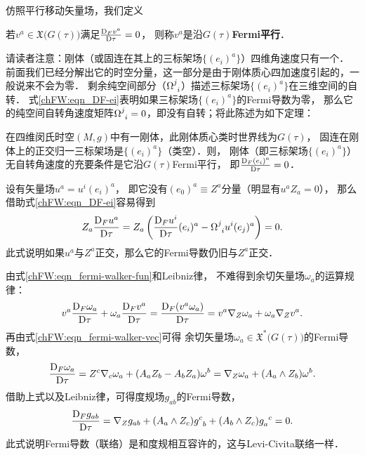 仿照平行移动矢量场，我们定义
\begin{definition}
	若$v^a\in \mathfrak{X}\bigl(G(\tau)\bigr)$满足$\frac{{\rm D}_F v^a}{{\rm D}\tau}=0$，
	则称$v^a$是沿$G(\tau)${\heiti\bfseries Fermi平行}．
\end{definition}

请读者注意：刚体（或固连在其上的三标架场$\{(e_i)^a\}$）四维角速度只有一个．
前面我们已经分解出它的时空分量，这一部分是由于刚体质心四加速度引起的，一般说来不会为零．
剩余纯空间部分（$\Omega^{j}_{\hphantom{j} i}$）描述三标架场$\{(e_i)^a\}$在三维空间的自转．
式\eqref{chFW:eqn_DF-ei}表明如果三标架场$\{(e_i)^a\}$的Fermi导数为零，
那么它的纯空间自转角速度矩阵$\Omega^{j}_{\hphantom{j} i}=0$，即没有自转；将此陈述为如下定理：

\begin{theorem}\label{chFW:thm_FermiD-rotation}
	在四维闵氏时空$(M,g)$中有一刚体，此刚体质心类时世界线为$G(\tau)$，
	固连在刚体上的正交归一三标架场是$\{(e_i)^a\}$（类空）．则，
	刚体（即三标架场$\{(e_i)^a\}$）无自转角速度的充要条件是它沿$G(\tau)$Fermi平行，
	即$\frac{{\rm D}_F (e_i)^a}{{\rm D}\tau}=0$．
\end{theorem}




设有矢量场$u^a = u^i (e_i)^a$，
即它没有$(e_0)^a\equiv Z^a$分量（明显有$u^a Z_a =0$），
那么借助式\eqref{chFW:eqn_DF-ei}容易得到
\begin{equation}\label{chFW:eqn_DFuz=0}
	Z_a \frac{{\rm D}_F u^a}{{\rm D}\tau} =
	Z_a \left( \frac{{\rm D}_F u^i}{{\rm D}\tau} (e_i)^a
	-\Omega^{j}_{\hphantom{j} i} u^i (e_j)^a  \right) = 0.
\end{equation}
此式说明如果$u^a$与$Z^a$正交，那么它的Fermi导数仍旧与$Z^a$正交．


由式\eqref{chFW:eqn_fermi-walker-fun}和Leibniz律，
不难得到余切矢量场$\omega_a$的运算规律：
\begin{equation*}
	v^a \frac{{\rm D}_F \omega_a}{{\rm D}\tau}
	+\omega_a \frac{{\rm D}_F v^a }{{\rm D}\tau}
	=\frac{{\rm D}_F (v^a \omega_a)}{{\rm D}\tau}
	=v^a \nabla_Z \omega_a + \omega_a\nabla_Z v^a .
\end{equation*}
再由式\eqref{chFW:eqn_fermi-walker-vec}可得
余切矢量场$\omega_a\in \mathfrak{X}^*\bigl(G(\tau)\bigr)$的Fermi导数，
\begin{equation}\label{chFW:eqn_fermi-walker-covec}
	\frac{{\rm D}_F \omega_a}{{\rm D}\tau} =  Z^c \nabla_c \omega_a
	+(A_a Z_b-A_b Z_a) \omega^b = \nabla_Z \omega_a + (A_a\wedge Z_b) \omega^b.
\end{equation}
借助上式以及Leibniz律，可得度规场$g_{ab}$的Fermi导数，
\begin{equation}\label{chFW:eqn_FD-comp}
	\frac{{\rm D}_F g_{ab}}{{\rm D}\tau}= \nabla_Z g_{ab}
	+ (A_a\wedge Z_c) g_{\hphantom{a} b}^c + (A_b\wedge Z_c) g_{a}^{\hphantom{a} c} =0.
\end{equation}
此式说明Fermi导数（联络）是和度规相互容许的，这与Levi-Civita联络一样．

